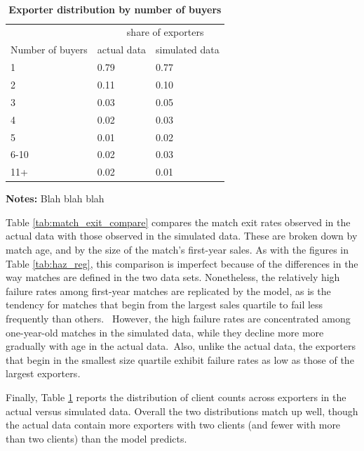 \documentclass[12pt]{article}
\begin{document}
\begin{table}[]
\caption{\textbf{Exporter distribution by number of buyers}}
\label{tab:client_dist_compare}%
\centering
{\small \ }
\par
{\small %
}
\par
{\small 
\begin{tabular}{lll}
\hline\hline
& \multicolumn{2}{l}{\ \ \ \ \ \ share of exporters} \\ \cline{2-3}
Number of buyers & actual data & simulated data \\ \hline
1 & 0.79 & 0.77 \\ 
2 & 0.11 & 0.10 \\ 
3 & 0.03 & 0.05 \\ 
4 & 0.02 & 0.03 \\ 
5 & 0.01 & 0.02 \\ 
6-10 & 0.02 & 0.03 \\ 
11+ & 0.02 & 0.01 \\ \hline
\end{tabular}
}
\par
{\endcenter
\begin{tablenotes}
\item \textbf{Notes:} Blah blah blah 
\end{tablenotes}
} %
\end{table}

Table \ref{tab:match_exit_compare} compares the match exit rates observed in
the actual data with those observed in the simulated data. These are broken
down by match age, and by the size of the match's first-year sales. As with
the figures in Table \ref{tab:haz_reg}, this comparison is imperfect because
of the differences in the way matches are defined in the two data sets.
Nonetheless, the relatively high failure rates among first-year matches are
replicated by the model, as is the tendency for matches that begin from the
largest sales quartile to fail less frequently than others.\textit{\ }%
However, the high failure rates are concentrated among one-year-old matches
in the simulated data, while they decline more more gradually with age in
the actual data.\textit{\ }Also, unlike the actual data, the exporters that
begin in the smallest size quartile exhibit failure rates as low as those of
the largest exporters\textit{.}

Finally, Table \ref{tab:client_dist_compare} reports the distribution of
client counts across exporters in the actual versus simulated data. Overall
the two distributions match up well, though the actual data contain more
exporters with two clients (and fewer with more than two clients) than the
model predicts.
\end{document}
